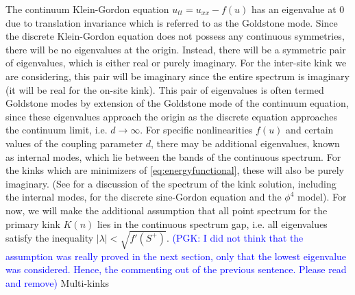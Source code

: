 \documentclass[12pt,reqno]{amsart}
\newcommand{\revisedd}[2]{ \textcolor{blue}{#1} }
\begin{document}
The continuum Klein-Gordon equation $u_{tt} = u_{xx} - f(u)$ has an eigenvalue at 0 due to translation invariance which is referred to as the Goldstone mode. Since the discrete Klein-Gordon equation does not possess any continuous symmetries, there will be no eigenvalues at the origin. Instead, there will be a symmetric pair of eigenvalues, which is either real or purely imaginary. For the inter-site kink we are considering, this pair will be imaginary since the entire spectrum is imaginary (it will be real for the on-site kink). This pair of eigenvalues is often termed Goldstone modes by extension of the Goldstone mode of the continuum equation, since these eigenvalues approach the origin as the discrete equation approaches the continuum limit, i.e. $d \rightarrow \infty$. For specific nonlinearities $f(u)$ and certain values of the coupling parameter $d$, there may be additional eigenvalues, known as internal modes, which lie between the bands of the continuous spectrum. For the kinks which are minimizers of \cref{eq:energyfunctional}, these will also be purely imaginary. (See \cites{cretegny,KevrekidisWeinstein2000}
for a discussion of the spectrum of the kink solution, including the internal modes, for the discrete sine-Gordon equation and the $\phi^4$ model). For now, we will make the additional assumption that all point spectrum for the primary kink $K(n)$ lies in the continuous spectrum gap, i.e. all eigenvalues satisfy the inequality $|\lambda| < \sqrt{f'(S^+)}$. 
\revisedd{(PGK: I did not think that the assumption was really proved in 
the next section, only that the lowest eigenvalue was considered. 
Hence, the commenting out of the previous sentence.
Please read
and remove)}

\section{Multi-kinks}\label{sec:multikink}
\end{document}
